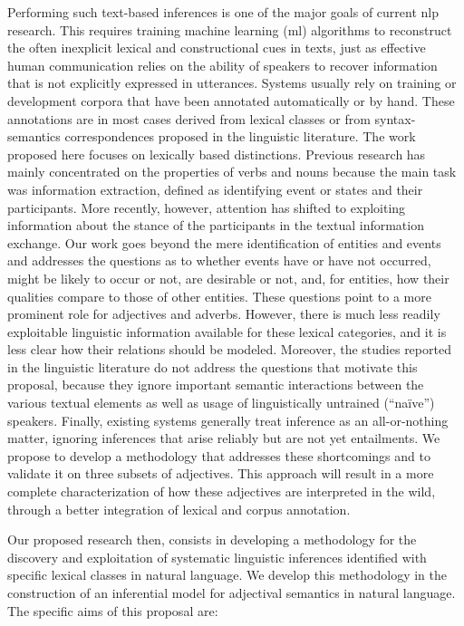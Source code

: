 \documentclass[10pt]{article}
\begin{document}
Performing such text-based inferences is one of the major goals of current {\sc nlp} research. 
This requires training machine learning ({\sc ml}) algorithms to  reconstruct the often inexplicit lexical and constructional cues in texts, just as effective human communication relies on the ability of speakers to recover information that is not explicitly expressed in utterances. 
Systems usually rely on training or development corpora that have been annotated automatically or by hand.  
These annotations are in most cases derived from lexical classes or from syntax-semantics correspondences proposed in the linguistic literature. The work proposed here focuses on lexically based distinctions. 
Previous research has mainly concentrated on the properties of verbs and nouns because the main task was information extraction, defined as identifying event or states and their participants. 
More recently, however, attention has shifted to exploiting information about the stance of the participants in the textual information exchange. 
Our work goes beyond the mere identification of entities and events and addresses the questions as to whether events have or have not occurred, might be likely to occur or not, are desirable or not, and, for entities, how their qualities compare to those of other entities. 
These questions point to a more prominent role for adjectives and adverbs. 
However, there is much less readily exploitable linguistic information available for these lexical categories, and it is less clear how their relations should be modeled. 
Moreover, the studies reported in the linguistic literature do not address the questions that motivate this proposal, because they ignore important semantic interactions between the various textual elements as well as usage of linguistically untrained (``na\"ive'') speakers. 
Finally, existing systems generally treat inference as an all-or-nothing matter, ignoring inferences that arise reliably but are not yet entailments.
We propose to develop a methodology that addresses these shortcomings and to validate it on three subsets of adjectives.
This approach will result in a more complete characterization of how  these adjectives are interpreted in the wild, through a better integration of lexical and corpus annotation. 
 
Our proposed research then, consists in developing a methodology for the discovery and exploitation of systematic linguistic inferences identified with specific lexical classes in natural language. 
We develop this methodology in the construction of an inferential model for adjectival semantics in natural language. The specific aims of this proposal are:
\end{document}
